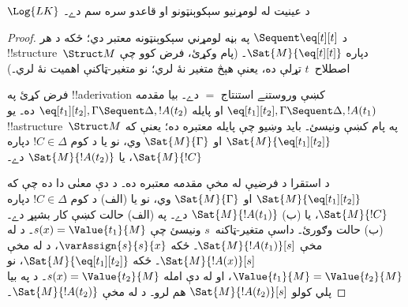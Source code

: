 \documentclass[../../../include/open-logic-section]{subfiles}
\begin{document}


\begin{prop}
$\Log{LK}$ د عينيت له لومړنيو سېکوېنټونو او قاعدو سره سم دے۔
\end{prop}

\begin{proof}
د ${} \Sequent \eq[t][t]$ په بڼه لومړني سېکوېنټونه معتبر دي؛
ځکه د هر !!{structure}~$\Struct M$ دپاره
$\Sat{M}{\eq[t][t]}$۔ (پام وکړئ، فرض کوو چې اصطلاح~$t$ تړلې ده،
يعنې هېڅ متغير نۀ لري؛ نو متغير-ټاکنې اهميت نۀ لري۔)

فرض کړئ په !!a{derivation} کښې وروستنے استنتاج $=$ دے۔ بيا مقدمه
$\eq[t_1][t_2], \Gamma \Sequent \Delta, !A(t_1)$ او پايله
$\eq[t_1][t_2], \Gamma \Sequent \Delta, !A(t_2)$ ده۔ يو
!!a{structure}~$\Struct M$ په پام کښې ونيسئ۔ بايد وښيو چې پايله
معتبره ده؛ يعنې که $\Sat{M}{\eq[t_1][t_2]}$ او
$\Sat{M}{\Gamma}$ وي، نو يا د کوم $!C \in \Delta$ دپاره
$\Sat{M}{!C}$، يا $\Sat{M}{!A(t_2)}$ دے۔

د استقرا د فرضيې له مخې مقدمه معتبره ده۔ د دې معنٰی دا ده چې که
$\Sat{M}{\eq[t_1][t_2]}$ او $\Sat{M}{\Gamma}$ وي، نو يا
(الف) د کوم $!C \in \Delta$ دپاره $\Sat{M}{!C}$، يا
(ب) $\Sat{M}{!A(t_1)}$ دے۔ په (الف) حالت کښې کار بشپړ دے۔ (ب)
حالت وګورئ۔ داسې متغير-ټاکنه~$s$ ونيسئ چې
$s(x) = \Value{t_1}{M}$۔ د
 له مخې
$\Sat{M}{!A(t_1)}[s]$۔ ځکه $\varAssign{s}{s}{x}$، د
 له مخې
$\Sat{M}{!A(x)}[s]$۔ ځکه $\Sat{M}{\eq[t_1][t_2]}$، نو
$\Value{t_1}{M} = \Value{t_2}{M}$، او له دې امله
$s(x) = \Value{t_2}{M}$۔ د
 په بيا پلي کولو
$\Sat{M}{!A(t_2)}[s]$ هم لرو۔ د
 له مخې
$\Sat{M}{!A(t_2)}$۔
\end{proof}
\end{document}
